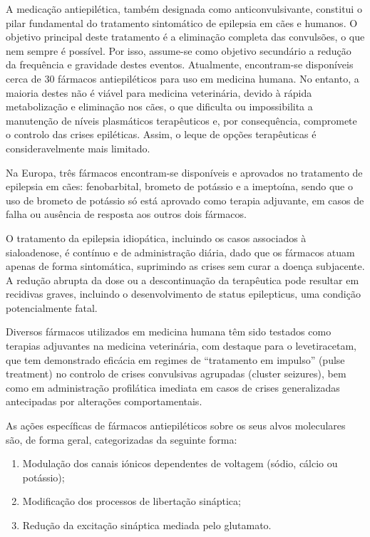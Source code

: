 A medicação antiepilética, também designada como anticonvulsivante, constitui o pilar fundamental do tratamento sintomático de epilepsia em cães e humanos. O objetivo principal deste tratamento é a eliminação completa das convulsões, o que nem sempre é possível. Por isso, assume-se como objetivo secundário a redução da frequência e gravidade destes eventos.\cite{Loscher2022}
Atualmente, encontram-se disponíveis cerca de 30 fármacos antiepiléticos para uso em medicina humana. No entanto, a maioria destes não é viável para medicina veterinária, devido à rápida metabolização e eliminação nos cães, o que dificulta ou impossibilita a manutenção de níveis plasmáticos terapêuticos e, por consequência, compromete o controlo das crises epiléticas. \cite{Loscher2022} Assim, o leque de opções terapêuticas é consideravelmente mais limitado. \cite{Loscher2022}


Na Europa, três fármacos encontram-se disponíveis e aprovados no tratamento de epilepsia em cães: fenobarbital, brometo de potássio e a imeptoína, sendo que o uso de brometo de potássio só está aprovado como terapia adjuvante, em casos de falha ou ausência de resposta aos outros dois fármacos. \cite{Royaux2017}


O tratamento da epilepsia idiopática, incluindo os casos associados à sialoadenose, é contínuo e de administração diária, dado que os fármacos atuam apenas de forma sintomática, suprimindo as crises sem curar a doença subjacente. A redução abrupta da dose ou a descontinuação da terapêutica pode resultar em recidivas graves, incluindo o desenvolvimento de status epilepticus, uma condição potencialmente fatal. 


Diversos fármacos utilizados em medicina humana têm sido testados como terapias adjuvantes na medicina veterinária, com destaque para o levetiracetam, que tem demonstrado eficácia em regimes de “tratamento em impulso” (pulse treatment) no controlo de crises convulsivas agrupadas (cluster seizures), bem como em administração profilática imediata em casos de crises generalizadas antecipadas por alterações comportamentais. 


As ações específicas de fármacos antiepiléticos sobre os seus alvos moleculares são, de forma geral, categorizadas da seguinte forma: \cite{Katzung2018}

\begin{enumerate}
    \item	Modulação dos canais iónicos dependentes de voltagem (sódio, cálcio ou potássio);
    \item Modificação dos processos de libertação sináptica;
    \item Redução da excitação sináptica mediada pelo glutamato.
\end{enumerate}

